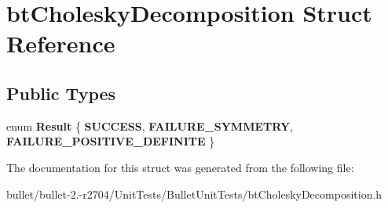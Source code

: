 \hypertarget{structbt_cholesky_decomposition}{\section{bt\+Cholesky\+Decomposition Struct Reference}
\label{structbt_cholesky_decomposition}
}
\subsection*{Public Types}
\begin{DoxyCompactItemize}
\item 
\hypertarget{structbt_cholesky_decomposition_aca1eb941d6cdfb476d59795daeedc197}{enum {\bfseries Result} \{ {\bfseries S\+U\+C\+C\+E\+S\+S}, 
{\bfseries F\+A\+I\+L\+U\+R\+E\+\_\+\+S\+Y\+M\+M\+E\+T\+R\+Y}, 
{\bfseries F\+A\+I\+L\+U\+R\+E\+\_\+\+P\+O\+S\+I\+T\+I\+V\+E\+\_\+\+D\+E\+F\+I\+N\+I\+T\+E}
 \}}\label{structbt_cholesky_decomposition_aca1eb941d6cdfb476d59795daeedc197}

\end{DoxyCompactItemize}


The documentation for this struct was generated from the following file\+:\begin{DoxyCompactItemize}
\item 
bullet/bullet-\/2.-\/r2704/\+Unit\+Tests/\+Bullet\+Unit\+Tests/bt\+Cholesky\+Decomposition.\+h\end{DoxyCompactItemize}
